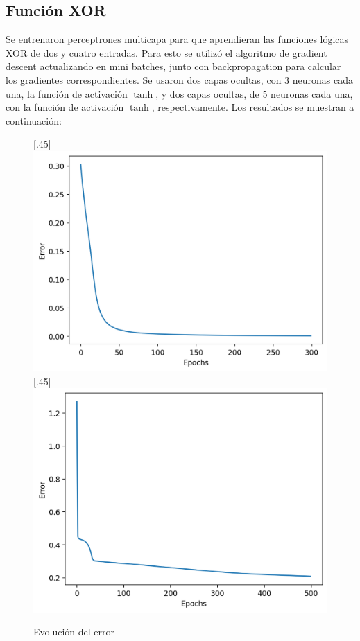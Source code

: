 \documentclass[12pt,a4paper]{article}
\begin{document}
\subsection{Función XOR}
Se entrenaron perceptrones multicapa para que aprendieran las funciones lógicas XOR de dos y cuatro entradas. Para esto se utilizó el algoritmo de gradient descent actualizando en mini batches, junto con backpropagation para calcular los gradientes correspondientes. Se usaron dos capas ocultas, con 3 neuronas cada una, la función de activación $\tanh$, y dos capas ocultas, de 5 neuronas cada una, con la función de activación $\tanh$, respectivamente. Los resultados se muestran a continuación:
\begin{figure}[H]
  [.45\linewidth]{
    \includegraphics[width=\linewidth]{img/11-training_error.png}
  }
  [.45\linewidth]{
    \includegraphics[width=\linewidth]{img/12-training_error.png}
  }
  \caption*{Evolución del error}
  \centering
\end{figure}
\end{document}
